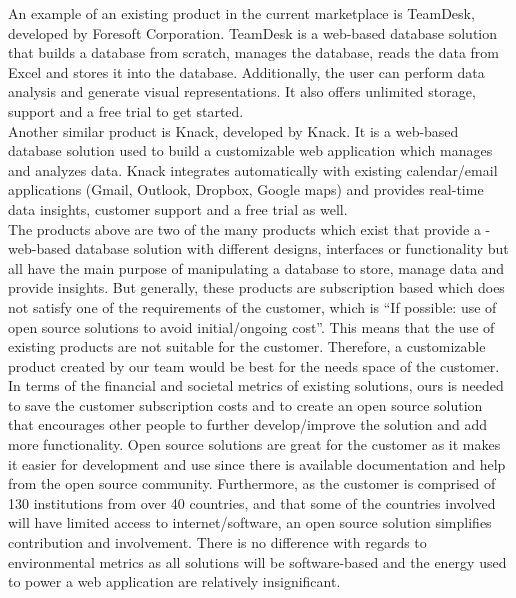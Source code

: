 \documentclass[11pt]{article}
\begin{document}
An example of an existing product in the current marketplace is TeamDesk, developed by Foresoft Corporation.\cite{foresoft} TeamDesk is a web-based database solution that builds a database from scratch, manages the database, reads the data from Excel and stores it into the database. Additionally, the user can perform data analysis and generate visual representations. It also offers unlimited storage, support and a free trial to get started. \\

Another similar product is Knack, developed by Knack.\cite{knack} It is a web-based database solution used to build a customizable web application which manages and analyzes data. Knack integrates automatically with existing calendar/email applications (Gmail, Outlook, Dropbox, Google maps) and provides real-time data insights, customer support and a free trial as well. \\

The products above are two of the many products which exist that provide a -web-based database solution with different designs, interfaces or functionality but all have the main purpose of manipulating a database to store, manage data and provide insights. But generally, these products are subscription based which does not satisfy one of the requirements of the customer, which is “If possible: use of open source solutions to avoid initial/ongoing cost”. This means that the use of existing products are not suitable for the customer. Therefore, a customizable product created by our team would be best for the needs space of the customer. \\

In terms of the financial and societal metrics of existing solutions, ours is needed to save the customer subscription costs and to create an open source solution that encourages other people to further develop/improve the solution and add more functionality. Open source solutions are great for the customer as it makes it easier for development and use since there is available documentation and help from the open source community. Furthermore, as the customer is comprised of 130 institutions from over 40 countries, and that some of the countries involved will have limited access to internet/software, an open source solution simplifies contribution and involvement. There is no difference with regards to environmental metrics as all solutions will be software-based and the energy used to power a web application are relatively insignificant. \\
\end{document}
